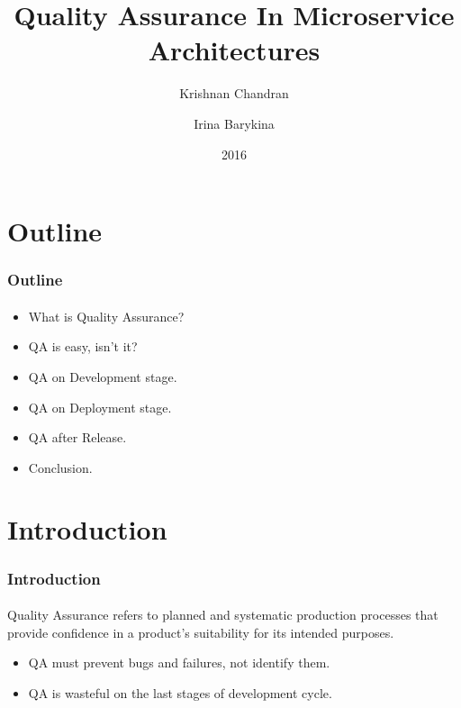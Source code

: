 \documentclass{beamer}
\title{Quality Assurance In Microservice Architectures}
\author{Krishnan Chandran \and Irina Barykina}
\institute[NYU]
{
Department of Informatics,\\
Intelligent Adaptive Systems, UHH\\
}
\date{2016}
\begin{document}
\begin{frame}
\titlepage
\end{frame}


\section{Outline}
\begin{frame}
	\frametitle{Outline}	
	\framesubtitle{}
	\begin{itemize}
		\item What is Quality Assurance?
 		\item QA is easy, isn't it?
		\item QA on Development stage.
		\item QA on Deployment stage.
		\item QA after Release.
		\item Conclusion.
	\end{itemize}
\end{frame}

\section{Introduction}
\begin{frame}
	\frametitle{Introduction}	
	\framesubtitle{}

\begin{definition}
Quality Assurance refers to planned and systematic production processes that provide confidence in a product's suitability for its intended purposes.
\end{definition}
	\begin{itemize}
 		\item QA must prevent bugs and failures, not identify them.
		\item QA is wasteful on the last stages of development cycle.
	\end{itemize}
\end{frame}

\end{document}
